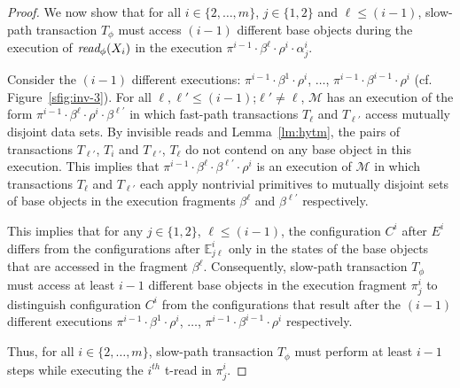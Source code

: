 \begin{proof}
%
%
We now show that for all $i\in \{2,\ldots, m\}$, $j\in \{1,2\}$ and $\ell \leq (i-1)$, slow-path transaction $T_{\phi}$ must access
$(i-1)$ different base objects during the execution of $\textit{read}_{\phi}(X_i)$ in the execution
$\pi^{i-1}\cdot \beta^{\ell}\cdot \rho^i \cdot \alpha_j^i$.

Consider the $(i-1)$ different executions: 
$\pi^{i-1}\cdot\beta^{1}\cdot \rho^i$, $\ldots$, $\pi^{i-1}\cdot\beta^{i-1}\cdot \rho^i$ (cf. Figure~\ref{sfig:inv-3}).
For all $\ell, \ell' \leq (i-1)$;$\ell' \neq \ell$, 
$\mathcal{M}$ has an execution of the form $\pi^{i-1}\cdot \beta^{\ell}\cdot \rho^i \cdot \beta^{\ell'}$
in which fast-path transactions $T_{\ell}$ and $T_{\ell'}$ access mutually disjoint data sets.
By invisible reads and Lemma~\ref{lm:hytm}, the pairs of transactions $T_{\ell'}$, $T_{i}$ and $T_{\ell'}$, $T_{\ell}$
do not contend on any base object in this execution.
This implies that $\pi^{i-1}\cdot \beta^{\ell} \cdot \beta^{\ell'} \cdot \rho^i$ is an execution of $\mathcal{M}$ in which
transactions $T_{\ell}$ and $T_{\ell'}$ each apply nontrivial primitives
to mutually disjoint sets of base objects in the execution fragments $\beta^{\ell}$ and $\beta^{\ell'}$ respectively.

This implies that for any $j\in \{1,2\}$, $\ell \leq (i-1)$, the configuration $C^i$ after $E^i$ differs from the configurations
after $\mathbb{E}_{j\ell}^{i}$ only in the states of the base objects that are accessed in the fragment $\beta^{\ell}$.
Consequently, slow-path transaction $T_{\phi}$ must access at least $i-1$ different base objects
in the execution fragment $\pi_j^i$
to distinguish configuration $C^i$ from the configurations
that result after the $(i-1)$ different executions 
$\pi^{i-1}\cdot\beta^{1}\cdot \rho^i$, $\ldots$, $\pi^{i-1}\cdot\beta^{i-1}\cdot \rho^i$ respectively.

Thus, for all $i \in \{2,\ldots, m\}$, slow-path transaction $T_{\phi}$ must perform at least $i-1$ steps 
while executing the $i^{th}$ t-read in $\pi_{j}^i$.
\end{proof}
%
%